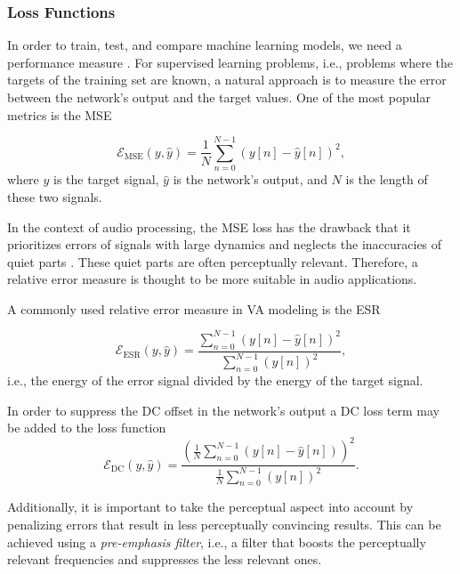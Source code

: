 \subsubsection{Loss Functions}
\label{sec:loss_functions}

In order to train, test, and compare machine learning models, we need a performance measure \cite{Goodfellow-et-al-2016}. For supervised learning problems, i.e., problems where the targets of the training set are known, a natural approach is to measure the error between the network's output and the target values. One of the most popular metrics is the \ac{MSE}

\begin{equation}
  \mathcal{E}_\text{MSE}(y, \hat{y}) = \frac{1}{N} \sum \limits_{n=0}^{N-1} (y[n] - \hat{y}[n])^2,
\end{equation}
where $y$ is the target signal, $\hat{y}$ is the network's output, and $N$ is the length of these two signals.

In the context of audio processing, the \ac{MSE} loss has the drawback that it prioritizes errors of signals with large dynamics and neglects the inaccuracies of quiet parts \cite{Parker2019}. These quiet parts are often perceptually relevant. Therefore, a relative error measure is thought to be more suitable in audio applications.

A commonly used relative error measure in \ac{VA} modeling is the \ac{ESR} \cite{Wright2019,Wright2019a, Wrightetal2020,Wright2020}

\begin{equation}
  \mathcal{E}_\text{ESR}(y, \hat{y}) = \frac{\sum_{n=0}^{N-1} (y[n] - \hat{y}[n])^2}{\sum_{n=0}^{N-1} (y[n])^2},
  \label{eq:esr}
\end{equation}
i.e., the energy of the error signal divided by the energy of the target signal.

In order to suppress the DC offset in the network's output a DC loss term may be added to the loss function \cite{Wright2019a,Wright2020}
\begin{equation}
  \mathcal{E}_\text{DC}(y, \hat{y}) = \frac{\left(\frac{1}{N} \sum_{n=0}^{N-1} (y[n] - \hat{y}[n])\right)^2}{\frac{1}{N} \sum_{n=0}^{N-1} (y[n])^2}.
\end{equation}

Additionally, it is important to take the perceptual aspect into account by penalizing errors that result in less perceptually convincing results. This can be achieved using a \emph{pre-emphasis filter}, i.e., a filter that boosts the perceptually relevant frequencies and suppresses the less relevant ones.

